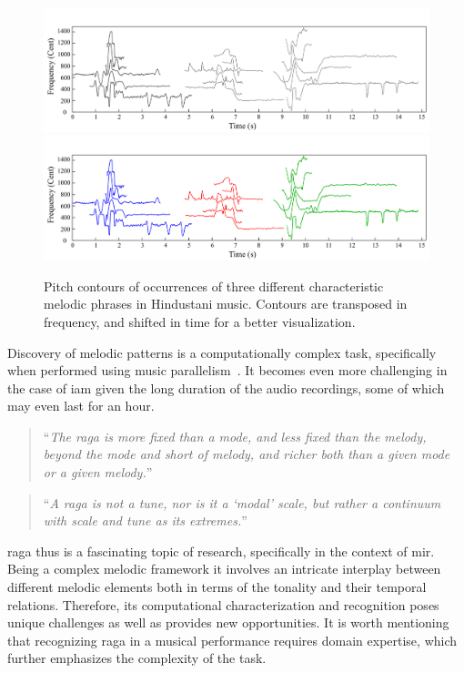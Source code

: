 \begin{figure}
	\begin{center}
		\ifdefined\PRINTVER
			\includegraphics[width=\figSizeHundred]{ch01_introduction/figures/phraseClassesExample_BW.pdf}
		\else
			\includegraphics[width=\figSizeHundred]{ch01_introduction/figures/phraseClassesExample.pdf}
		\fi
	\end{center}
	\caption[Examples of the characteristic melodic phrases in Hindustani Music]{Pitch contours of occurrences of three different characteristic melodic phrases in Hindustani music. Contours are transposed in frequency, and shifted in time for a better visualization.}
	\label{fig:phraseComplexityExample_intro}
\end{figure}

Discovery of melodic patterns is a computationally complex task, specifically when performed using music parallelism~\citep{Cambouropoulos2006}. It becomes even more challenging in the case of \gls{iam} given the long duration of the audio recordings, some of which may even last for an hour.

\blockcquote[p. 96]{martinez2001semiosis}{``\textit{The \gls{raga} is more fixed than a mode, and less fixed than the melody, beyond the mode and short of melody, and richer both than a given mode or a given melody.}''}


\blockcquote[]{powers1963background}{``\textit{A \gls{raga} is not a tune, nor is it a `modal' scale, but rather a continuum with scale and tune as its extremes.}''}

\Gls{raga} thus is a fascinating topic of research, specifically in the context of \gls{mir}. Being a complex melodic framework it involves an intricate interplay between different melodic elements both in terms of the tonality and their temporal relations. Therefore, its computational characterization and recognition poses unique challenges as well as provides new opportunities. It is worth mentioning that recognizing \gls{raga} in a musical performance requires domain expertise, which further emphasizes the complexity of the task.

